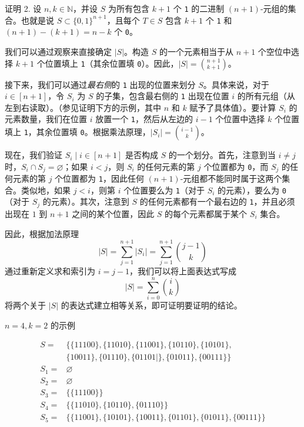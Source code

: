 \begin{proofs}{证明 2.}
    设 $n,k \in \mathbb{N}$，并设 $S$ 为所有包含 $k+1$ 个 \verb|1| 的二进制 $(n+1)$-元组的集合。也就是说 $S \subset \{0,1\}^{n+1}$，且每个 $T \in S$ 包含 $k+1$ 个 \verb|1| 和 $(n + 1) - (k + 1) = n - k$ 个 \verb|0|。

    我们可以通过观察来直接确定 $|S|$。构造 $S$ 的一个元素相当于从 $n + 1$ 个空位中选择 $k + 1$ 个位置填上 \verb|1|（其余位置填 \verb|0|）。因此，$|S| = {n+1 \choose k+1}$。

    接下来，我们可以通过\emph{最右侧}的 \verb|1| 出现的位置来划分 $S$。具体来说，对于 $i \in [n + 1]$，令 $S_i$ 为 $S$ 的子集，包含最右侧的 \verb|1| 出现在位置 $i$ 的所有元组（从左到右读取）。（参见证明下方的示例，其中 $n$ 和 $k$ 赋予了具体值）。要计算 $S_i$ 的元素数量，我们在位置 $i$ 放置一个 \verb|1|，然后从左边的 $i - 1$ 个位置中选择 $k$ 个位置填上 \verb|1|，其余位置填 \verb|0|。根据乘法原理，$|S_i| = {i-1 \choose k}$。

    现在，我们验证 ${S_i \mid i \in [n + 1]}$ 是否构成 $S$ 的一个划分。首先，注意到当 $i \ne j$ 时，$S_i \cap S_j = \varnothing$；如果 $i < j$，则 $S_i$ 的任何元素的第 $j$ 个位置都为 \verb|0|，而 $S_j$ 的任何元素的第 $j$ 个位置都为 \verb|1|，因此任何 $(n + 1)$-元组都不能同时属于这两个集合。类似地，如果 $j < i$，则第 $i$ 个位置要么为 \verb|1|（对于 $S_i$ 的元素），要么为 \verb|0|（对于 $S_j$ 的元素）。其次，注意到 $S$ 的任何元素都有一个最右边的 \verb|1|，并且必须出现在 $1$ 到 $n+1$ 之间的某个位置，因此 $S$ 的每个元素都属于某个 $S_i$ 集合。

    因此，根据加法原理
    \[|S| = \sum_{j=1}^{n+1} |S_i| = \sum_{j=1}^{n+1} {j-1 \choose k}\]
    通过重新定义求和索引为 $i = j - 1$，我们可以将上面表达式写成
    \[|S| = \sum_{i=0}^{n} {i \choose k}\]
    将两个关于 $|S|$ 的表达式建立相等关系，即可证明要证明的结论。
\end{proofs}

$n = 4, k = 2$ 的示例

\begin{align*}
    S =   & \Big\{\{11100\}, \{11010\}, \{11001\}, \{10110\}, \{10101\},                  \\
          & \{10011\}, \{01110\}, \{01101|\}, \{01011\}, \{00111\}\Big\}                  \\
    S_1 = & \varnothing                                                                   \\
    S_2 = & \varnothing                                                                   \\
    S_3 = & \Big\{\{11100\} \Big\}                                                        \\
    S_4 = & \Big\{\{11010\}, \{10110\}, \{01110\} \Big\}                                  \\
    S_5 = & \Big\{\{11001\}, \{10101\}, \{10011\}, \{01101\}, \{01011\}, \{00111\} \Big\} \\
\end{align*}

